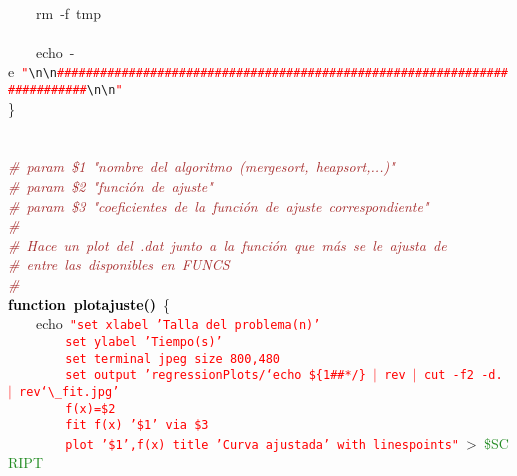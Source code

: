 \mbox{}\ \ \ \  \\
\mbox{}\ \ \ \ rm\ -f\ tmp \\
\mbox{}\ \ \ \  \\
\mbox{}\ \ \ \ echo\ -e\ \texttt{\textcolor{Red}{"{}}}\texttt{\textcolor{CarnationPink}{\textbackslash{}n\textbackslash{}n}}\texttt{\textcolor{Red}{\#\#\#\#\#\#\#\#\#\#\#\#\#\#\#\#\#\#\#\#\#\#\#\#\#\#\#\#\#\#\#\#\#\#\#\#\#\#\#\#\#\#\#\#\#\#\#\#\#\#\#\#\#\#\#\#\#\#\#\#\#\#\#\#\#\#\#\#\#\#\#\#\#\#}}\texttt{\textcolor{CarnationPink}{\textbackslash{}n\textbackslash{}n}}\texttt{\textcolor{Red}{"{}}} \\
\mbox{}\} \\
\mbox{} \\
\mbox{} \\
\mbox{}\textit{\textcolor{Brown}{\#\ param\ \$1\ "{}nombre\ del\ algoritmo\ (mergesort,\ heapsort,...)"{}}} \\
\mbox{}\textit{\textcolor{Brown}{\#\ param\ \$2\ "{}función\ de\ ajuste"{}}} \\
\mbox{}\textit{\textcolor{Brown}{\#\ param\ \$3\ "{}coeficientes\ de\ la\ función\ de\ ajuste\ correspondiente"{}}} \\
\mbox{}\textit{\textcolor{Brown}{\#}} \\
\mbox{}\textit{\textcolor{Brown}{\#\ Hace\ un\ plot\ del\ .dat\ junto\ a\ la\ función\ que\ más\ se\ le\ ajusta\ de}} \\
\mbox{}\textit{\textcolor{Brown}{\#\ entre\ las\ disponibles\ en\ FUNCS}} \\
\mbox{}\textit{\textcolor{Brown}{\#}} \\
\mbox{}\textbf{\textcolor{Black}{function\ plotajuste()}}\ \{ \\
\mbox{}\ \ \ \ echo\ \texttt{\textcolor{Red}{"{}set\ xlabel\ 'Talla\ del\ problema(n)'}} \\
\mbox{}\texttt{\textcolor{Red}{\ \ \ \ \ \ \ \ set\ ylabel\ 'Tiempo(s)'}} \\
\mbox{}\texttt{\textcolor{Red}{\ \ \ \ \ \ \ \ set\ terminal\ jpeg\ size\ 800,480}} \\
\mbox{}\texttt{\textcolor{Red}{\ \ \ \ \ \ \ \ set\ output\ 'regressionPlots/`echo\ \$\{1\#\#*/\}\ $|$\ rev\ $|$\ cut\ -f2\ -d.\ $|$\ rev`$\_$fit.jpg'}} \\
\mbox{}\texttt{\textcolor{Red}{\ \ \ \ \ \ \ \ f(x)=\$2}} \\
\mbox{}\texttt{\textcolor{Red}{\ \ \ \ \ \ \ \ fit\ f(x)\ '\$1'\ via\ \$3}} \\
\mbox{}\texttt{\textcolor{Red}{\ \ \ \ \ \ \ \ plot\ '\$1',f(x)\ title\ 'Curva\ ajustada'\ with\ linespoints"{}}}\ \textcolor{BrickRed}{\textgreater{}}\ \textcolor{ForestGreen}{\$SCRIPT} \\
